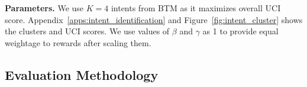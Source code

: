 \noindent\textbf{Parameters.}
We use $K=4$ intents from BTM as it maximizes overall UCI score. Appendix~\ref{apps:intent_identification} and Figure~\ref{fig:intent_cluster} shows the clusters and UCI scores. We use values of $\beta$ and $\gamma$ as 1 to provide equal weightage to rewards after scaling them.

\subsection {Evaluation Methodology}
\label{sec:evaluation}
\vspace{-0.1em}
%
%
%

